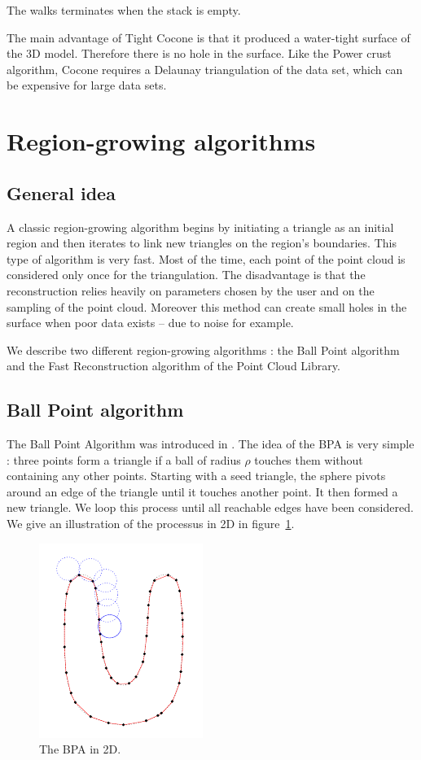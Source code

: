 \documentclass[12pt]{article}
\begin{document}
The walks terminates when the stack is empty.

The main advantage of Tight Cocone is that it produced a water-tight surface of the 3D model. Therefore there is no hole in the surface. Like the Power crust algorithm, Cocone requires a Delaunay triangulation of the data set, which can be expensive for large data sets.

\newpage

\section{Region-growing algorithms}
\subsection{General idea}
A classic region-growing algorithm begins by initiating a triangle as an initial region and then iterates to link new triangles on the region's boundaries. This type of algorithm is very fast. Most of the time, each point of the point cloud is considered only once for the triangulation. The disadvantage is that the reconstruction relies heavily on parameters chosen by the user and on the sampling of the point cloud. Moreover this method can create small holes in the surface when poor data  exists -- due to noise for example. 

We describe two different region-growing algorithms : the Ball Point algorithm and the Fast Reconstruction algorithm of the Point Cloud Library.

\subsection{Ball Point algorithm}
The Ball Point Algorithm was introduced in \cite{BPA}. The idea of the BPA is very simple : three points form a triangle if a ball of radius $\rho$ touches them without containing any other points. Starting with a seed triangle, the sphere pivots around an edge of the triangle until it touches another point. It then formed a new triangle. We loop this process until all reachable edges have been considered. We give an illustration of the processus in 2D in figure~\ref{bpa2D}.

\begin{figure}[h]
  \centering
  \includegraphics[scale=0.5]{BPA.png}
  \caption{\label{bpa2D} The BPA in 2D.}
\end{figure}
\end{document}
